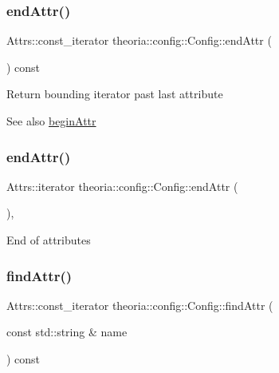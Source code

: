 \subsubsection{\texorpdfstring{end\+Attr()}{endAttr()}\hspace{0.1cm}{\footnotesize\ttfamily [1/2]}}
{\footnotesize\ttfamily Attrs\+::const\+\_\+iterator theoria\+::config\+::\+Config\+::end\+Attr (\begin{DoxyParamCaption}{ }\end{DoxyParamCaption}) const\hspace{0.3cm}{\ttfamily [inline]}}

Return bounding iterator past last attribute \begin{DoxySeeAlso}{See also}
\hyperlink{classtheoria_1_1config_1_1Config_a4bd7712d99a507b1da47da9257094051}{begin\+Attr} 
\end{DoxySeeAlso}
\mbox{\label{classtheoria_1_1config_1_1Config_adc788e451cd49c6b2c85948bf8f9fb21}} 
\subsubsection{\texorpdfstring{end\+Attr()}{endAttr()}\hspace{0.1cm}{\footnotesize\ttfamily [2/2]}}
{\footnotesize\ttfamily Attrs\+::iterator theoria\+::config\+::\+Config\+::end\+Attr (\begin{DoxyParamCaption}{ }\end{DoxyParamCaption})\hspace{0.3cm}{\ttfamily [inline]}, {\ttfamily [protected]}}

End of attributes \mbox{\label{classtheoria_1_1config_1_1Config_a633738ea60f5d4d0d244bc7d05c9d17f}} 
\subsubsection{\texorpdfstring{find\+Attr()}{findAttr()}\hspace{0.1cm}{\footnotesize\ttfamily [1/2]}}
{\footnotesize\ttfamily Attrs\+::const\+\_\+iterator theoria\+::config\+::\+Config\+::find\+Attr (\begin{DoxyParamCaption}\item[{const std\+::string \&}]{name }\end{DoxyParamCaption}) const\hspace{0.3cm}{\ttfamily [inline]}}

